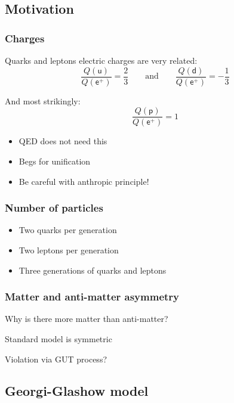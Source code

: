 \documentclass[english, fleqn]{beamer}
\newcommand\qqandqq{\qquad\text{and}\qquad}
\begin{document}
\subsection{Motivation}

\begin{frame}
    \frametitle{Charges}

    Quarks and leptons electric charges are very related:
    \[
        \frac{Q(\mathsf u)}{Q(\mathsf e^+)} = \frac 23
        \qqandqq
        \frac{Q(\mathsf d)}{Q(\mathsf e^+)} = - \frac 13
    \]

    \pause

    And most strikingly:
    \[
        \frac{Q(\mathsf p)}{Q(\mathsf e^+)} = 1
    \]

    \pause

    \begin{itemize}
        \item QED does not need this
        \item Begs for unification
        \item Be careful with anthropic principle!
    \end{itemize}
\end{frame}

\begin{frame}
    \frametitle{Number of particles}

    \begin{itemize}
        \item Two quarks per generation
        \item Two leptons per generation
        \item Three generations of quarks and leptons
    \end{itemize}
\end{frame}

\begin{frame}

    \frametitle{Matter and anti-matter asymmetry}

    Why is there more matter than anti-matter?

    Standard model is symmetric

    Violation via GUT process?
\end{frame}

\subsection{Georgi-Glashow model}
\end{document}
